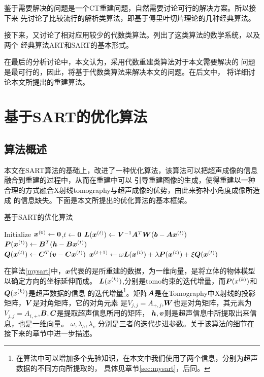 鉴于需要解决的问题是一个CT重建问题，自然需要讨论可行的解决方案。所以接下来
先讨论了比较流行的解析类算法，即基于傅里叶切片理论的几种经典算法。

接下来，又讨论了相对应用较少的代数类算法。列出了这类算法的数学系统，以及两个
经典算法ART和SART的基本形式。

在最后的分析讨论中，本文认为，采用代数重建类算法对于本文需要解决的
问题是最可行的，因此，将基于代数类算法来解决本文的问题。在后文中，
将详细讨论本文所提出的重建算法。


\chapter{基于SART的优化算法}
\section{算法概述}
本文在SART算法的基础上，改进了一种优化算法，该算法可以把超声成像的信息融合到重建的过程中，从而在重建中可以
引导重建图像的生成，使得重建以一种合理的方式融合X射线tomography与超声成像的优势，由此来弥补小角度成像所造成
的信息缺失。下面是本文所提出的优化算法的基本框架。
\begin{algo}\label{mysart}
基于SART的优化算法
\begin{algorithmic}[1]
\STATE
Initialize $\bm{ x}^{(0)} \leftarrow \bm{0}$,$t\leftarrow \bm{0}$
\REPEAT
\STATE
$\bm{L}(\bm{ x}^{(t)}) \leftarrow  \bm{V}^{-1}\bm{A}^T\bm{W}(\bm{b}-\bm{A}\bm{ x}^{(t)})$ \\
$\bm{P}(\bm{ x}^{(t)}) \leftarrow \bm{B}^{T}(\bm{h}-\bm{B}\bm{ x}^{(t)})$ \\    %
$\bm{Q}(\bm{ x}^{(t)}) \leftarrow \bm{C}^{T}(\bm{v}-\bm{C}\bm{ x}^{(t)})$         %
\STATE
$\bm{ x}^{(t+1)}\leftarrow \omega\bm{L}(\bm{ x}^{(t)}) + \lambda\bm{P}(\bm{ x}^{(t)}) + \xi\bm{Q}(\bm{ x}^{(t)})    $
\end{algorithmic}
\end{algo}

在算法\ref{mysart}中，$\bm{ x}$代表的是所重建的数据，为一维向量，是将立体的物体模型以确定方向的坐标延伸而成。
$\bm{L}(x^{(k)})$,分别是tomo约束的迭代增量，而$\bm{P}(x^{(k)})$和$ \bm{Q}(x^{(k)})$是超声数据的信息
的迭代增量\footnote{在算法中可以增加多个先验知识，在本文中我们使用了两个信息，分别为超声数据的不同方向所提取的，
具体见章节\ref{sec:mysart}，后同。}。矩阵$\bm{A}$是在Tomography中X射线的投影矩阵，$\bm{V}$是对角矩阵，它的对角元素
是$V_{j,j}=A_{+,j}$,$\bm{W}$也是对角矩阵，其元素为$V_{j,j}=A_{i,+}$,$\bm{B},\bm{C}$是提取超声信息所用的矩阵，
$\bm{h},\bm{v}$则是超声信息中所提取出来信息，也是一维向量。
$\omega,\lambda_h,\lambda_v$
分别是三者的迭代步进参数。关于该算法的细节在接下来的章节中进一步描述。



